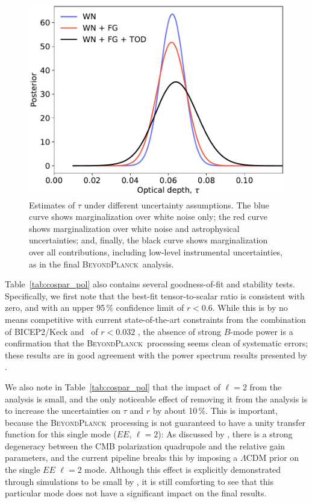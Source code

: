 \documentclass[twocolumn]{aa}
\newcommand{\BP}{\textsc{BeyondPlanck}}
\begin{document}
\begin{figure}[t]
	\center
	\includegraphics[width=\linewidth]{figs/BP10_tau_syst_assess.pdf}
        \caption{Estimates of $\tau$ under different uncertainty
          assumptions. The blue curve shows marginalization over white
          noise only; the red 
          curve shows marginalization over white noise and
          astrophysical uncertainties; and, finally, the black curve
          shows marginalization over all contributions, including
          low-level instrumental uncertainties, as in the
          final \BP\ analysis.}
	\label{fig:tau_assess}
\end{figure}


Table~\ref{tab:cospar_pol} also contains several goodness-of-fit and
stability tests. Specifically, we first note that the best-fit
tensor-to-scalar ratio is consistent with zero, and with an upper
95\,\% confidence limit of $r<0.6$. While this is by no means
competitive with current state-of-the-art constraints from the
combination of BICEP2/Keck and \Planck\ of $r<0.032$
\citep{tristram:2021}, the absence of strong $B$-mode power is a
confirmation that the \BP\ processing seems clean of systematic
errors; these results are in good agreement with the power spectrum
results presented by \citet{bp11}.

We also note in Table~\ref{tab:cospar_pol} that the impact of $\ell=2$
from the analysis is small, and the only noticeable effect of removing
it from the analysis is to increase the uncertainties on $\tau$ and
$r$ by about 10\,\%. This is important, because the \BP\ processing is
not guaranteed to have a unity transfer function for this single mode
($EE$, $\ell=2$): As discussed by \citet{bp07}, there is a strong
degeneracy between the CMB polarization quadrupole and the relative
gain parameters, and the current pipeline breaks this by imposing a
$\Lambda$CDM prior on the single $EE$ $\ell=2$ mode. Although this
effect is explicitly demonstrated through simulations to be small by
\citet{bp04}, it is still comforting to see that this particular mode
does not have a significant impact on the final results.
\end{document}
